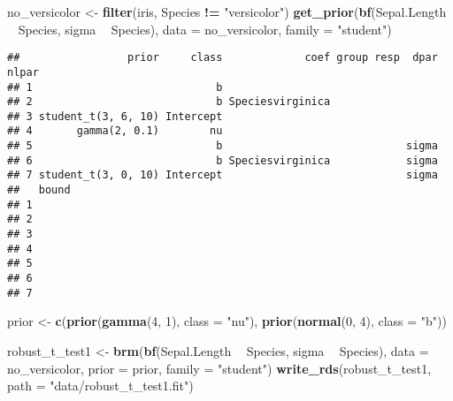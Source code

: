 \documentclass[]{article}
\newenvironment{Shaded}{\begin{snugshade}}{\end{snugshade}}
\newcommand{\KeywordTok}[1]{\textcolor[rgb]{0.13,0.29,0.53}{\textbf{#1}}}
\newcommand{\DataTypeTok}[1]{\textcolor[rgb]{0.13,0.29,0.53}{#1}}
\newcommand{\DecValTok}[1]{\textcolor[rgb]{0.00,0.00,0.81}{#1}}
\newcommand{\StringTok}[1]{\textcolor[rgb]{0.31,0.60,0.02}{#1}}
\newcommand{\OperatorTok}[1]{\textcolor[rgb]{0.81,0.36,0.00}{\textbf{#1}}}
\newcommand{\NormalTok}[1]{#1}
\begin{document}
\begin{Shaded}
\begin{Highlighting}[]
\NormalTok{no_versicolor <-}\StringTok{ }\KeywordTok{filter}\NormalTok{(iris, Species }\OperatorTok{!=}\StringTok{ "versicolor"}\NormalTok{)}
\KeywordTok{get_prior}\NormalTok{(}\KeywordTok{bf}\NormalTok{(Sepal.Length }\OperatorTok{~}\StringTok{ }\NormalTok{Species, sigma }\OperatorTok{~}\StringTok{ }\NormalTok{Species), }
          \DataTypeTok{data =}\NormalTok{ no_versicolor, }
          \DataTypeTok{family =} \StringTok{"student"}\NormalTok{)}
\end{Highlighting}
\end{Shaded}

\begin{verbatim}
##                 prior     class             coef group resp  dpar nlpar
## 1                             b                                        
## 2                             b Speciesvirginica                       
## 3 student_t(3, 6, 10) Intercept                                        
## 4       gamma(2, 0.1)        nu                                        
## 5                             b                             sigma      
## 6                             b Speciesvirginica            sigma      
## 7 student_t(3, 0, 10) Intercept                             sigma      
##   bound
## 1      
## 2      
## 3      
## 4      
## 5      
## 6      
## 7
\end{verbatim}

\begin{Shaded}
\begin{Highlighting}[]
\NormalTok{prior <-}\StringTok{ }\KeywordTok{c}\NormalTok{(}\KeywordTok{prior}\NormalTok{(}\KeywordTok{gamma}\NormalTok{(}\DecValTok{4}\NormalTok{, }\DecValTok{1}\NormalTok{), }\DataTypeTok{class =} \StringTok{"nu"}\NormalTok{),}
           \KeywordTok{prior}\NormalTok{(}\KeywordTok{normal}\NormalTok{(}\DecValTok{0}\NormalTok{, }\DecValTok{4}\NormalTok{), }\DataTypeTok{class =} \StringTok{"b"}\NormalTok{))}
\end{Highlighting}
\end{Shaded}

\begin{Shaded}
\begin{Highlighting}[]
\NormalTok{robust_t_test1 <-}\StringTok{ }\KeywordTok{brm}\NormalTok{(}\KeywordTok{bf}\NormalTok{(Sepal.Length }\OperatorTok{~}\StringTok{ }\NormalTok{Species, sigma }\OperatorTok{~}\StringTok{ }\NormalTok{Species), }
            \DataTypeTok{data =}\NormalTok{ no_versicolor, }
            \DataTypeTok{prior =}\NormalTok{ prior, }
            \DataTypeTok{family =} \StringTok{"student"}\NormalTok{)}
\KeywordTok{write_rds}\NormalTok{(robust_t_test1, }\DataTypeTok{path =} \StringTok{"data/robust_t_test1.fit"}\NormalTok{)}
\end{Highlighting}
\end{Shaded}
\end{document}
